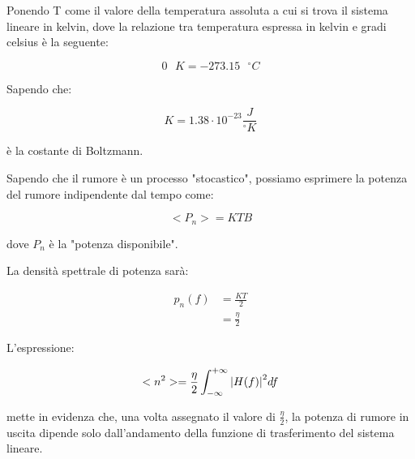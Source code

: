 \begin{tcolorbox}
    Ponendo T come il valore della temperatura assoluta a cui si trova il sistema lineare in kelvin, 
    dove la relazione tra temperatura espressa in kelvin e gradi celsius è la seguente: 

    {
        \Large 
        \begin{equation}
            0\text{ }K = -273.15 \text{ } ^{\circ} C
        \end{equation}
    }


    Sapendo che: 

{
    \Large 
    \begin{equation}
        K = 1.38 \cdot 10^{-23} \frac{J}{^{\circ} K}
    \end{equation}
}

è la costante di Boltzmann. \newline 

Sapendo che il rumore è un processo "stocastico", possiamo esprimere la potenza del rumore indipendente dal tempo come: 

{
    \Large 
    
        \begin{equation}
                <P_n>
                = 
                KTB
        \end{equation}
    
}

dove $P_n$ è la "potenza disponibile". \newline 

La densità spettrale di potenza sarà: 

{
    \Large 
    \begin{equation}
        \begin{split}
        p_n(f) 
        &= 
        \frac{KT}{2}
        \\
        &= \frac{\eta}{2}
        \end{split}
    \end{equation}
}

\end{tcolorbox}

L'espressione: 

{
    \Large 
    \begin{equation}
        <n^{2}>
        =
            \frac{\eta}{2}
             \int_{-\infty}^{+\infty}
            \abs{H(f)}^{2} 
            df
    \end{equation}
}

mette in evidenza che, una volta assegnato il valore di $\frac{\eta}{2}$, 
la potenza di rumore in uscita dipende solo dall'andamento della funzione di trasferimento del sistema lineare. \newline 

